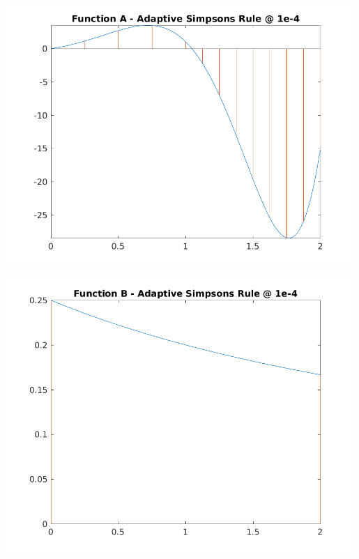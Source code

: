 \documentclass{article}
\begin{document}
\begin{center}
    \centering
    \begin{minipage}{0.5\textwidth}
        \centering
        \includegraphics[width=0.99\textwidth]{../output/a_adaptive_simpsons_4.png}
    \end{minipage}\hfill
    \begin{minipage}{0.5\textwidth}
        \centering
        \includegraphics[width=0.99\textwidth]{../output/b_adaptive_simpsons_4.png}
    \end{minipage}
	\label{fig:adap4}
\end{center}
\end{document}
